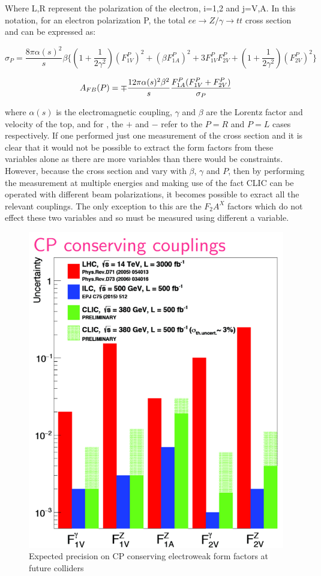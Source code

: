 Where L,R represent the polarization of the electron, i=1,2 and j=V,A. In this notation, for an electron polarization P, the total $ee\rightarrow Z/\gamma\rightarrow tt$ cross section and \afb can be expressed as:

\begin{equation}
\sigma_P = \frac{8\pi\alpha(s)^2}{s}\beta \{(1 + \frac{1}{2\gamma^2})(F_{1V}^P)^2 +(\beta F_{1A}^P)^2 +3F_{1V}^P F_{2V}^P + (1 + \frac{1}{2\gamma^2})(F_{2V}^P)^2\}
\end{equation}

\begin{equation}
\label{{eq:afbFormFactors}}
A_{FB}(P) = \mp \frac{12\pi\alpha(s)^2 \beta^2}{s}\frac{F_{1A}^P(F_{1V}^P +F_{2V}^P)}{\sigma_P}
\end{equation}

where $\alpha(s)$  is the electromagnetic coupling, $\gamma$ and $\beta$ are the Lorentz factor and velocity of the top, and for , the $+$ and $-$ refer to the $P=R$ and $P=L$ cases respectively. If one performed just one measurement of the cross section and \afb it is clear that it would not be possible to extract the form factors from these variables alone as there are more variables than there would be constraints. However, because the cross section and \afb vary with $\beta$, $\gamma$ and $P$, then by performing the measurement at multiple energies and making use of the fact \ac{CLIC} can be operated with different beam polarizations, it becomes possible to exract all the relevant couplings. The only exception to this are the $F_2A^X$ factors which do not effect these two variables and  so must be measured using different a variable. 

\begin{figure}
\centering
\includegraphics[width=0.35\linewidth]{Theory/fig/CPconserving}
\caption[Expected precision on CP conserving electroweak form factors at future colliders]{Expected precision on CP conserving electroweak form factors at future colliders}
\label{fig:CPConserving}
\end{figure}

